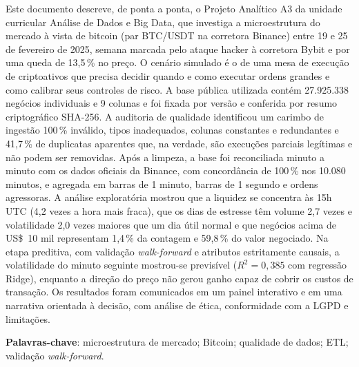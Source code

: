 \documentclass[
  12pt,
  openany,
  oneside,
  a4paper,
  chapter=TITLE,
  section=TITLE,
  english,
  brazil,
  sumario=tradicional
]{abntex2}
\newcommand{\usd}{US\$}
\begin{document}
\setlength{\absparsep}{18pt}
\begin{resumo}
Este documento descreve, de ponta a ponta, o Projeto Analítico A3 da unidade
curricular Análise de Dados e Big Data, que investiga a microestrutura do mercado
à vista de bitcoin (par BTC/USDT na corretora Binance) entre 19 e 25 de fevereiro
de 2025, semana marcada pelo ataque hacker à corretora Bybit e por uma queda de
13,5\,\% no preço. O cenário simulado é o de uma mesa de execução de
criptoativos que precisa decidir quando e como executar ordens grandes e como
calibrar seus controles de risco. A base pública utilizada contém 27.925.338
negócios individuais e 9 colunas e foi fixada por versão e conferida por
resumo criptográfico SHA-256. A auditoria de qualidade identificou um carimbo
de ingestão 100\,\% inválido, tipos inadequados, colunas constantes e
redundantes e 41,7\,\% de duplicatas aparentes que, na verdade, são execuções
parciais legítimas e não podem ser removidas. Após a limpeza, a base foi
reconciliada minuto a minuto com os dados oficiais da Binance, com concordância
de 100\,\% nos 10.080 minutos, e agregada em barras de 1 minuto, barras de
1 segundo e ordens agressoras. A análise exploratória mostrou que a liquidez se
concentra às 15h UTC (4,2 vezes a hora mais fraca), que os dias de estresse
têm volume 2,7 vezes e volatilidade 2,0 vezes maiores que um dia útil normal e
que negócios acima de \usd~10 mil representam 1,4\,\% da contagem e 59,8\,\% do
valor negociado. Na etapa preditiva, com validação \textit{walk-forward} e
atributos estritamente causais, a volatilidade do minuto seguinte mostrou-se
previsível ($R^2 = 0,385$ com regressão Ridge), enquanto a direção do preço
não gerou ganho capaz de cobrir os custos de transação. Os resultados foram
comunicados em um painel interativo e em uma narrativa orientada à decisão, com
análise de ética, conformidade com a LGPD e limitações.

\vspace{\onelineskip}
\noindent\textbf{Palavras-chave}: microestrutura de mercado; Bitcoin; qualidade de
dados; ETL; validação \textit{walk-forward}.
\end{resumo}
\end{document}
